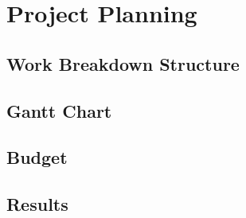 \chapter{Project Planning} \label{planning}
\section{Work Breakdown Structure}
\section{Gantt Chart}
\section{Budget}
\section{Results}